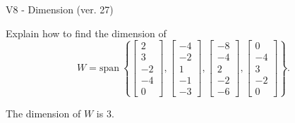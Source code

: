 \begin{exercise}
  \begin{exerciseTitle}V8 - Dimension (ver. 27)\end{exerciseTitle}
  \begin{exerciseStatement}
    Explain how to find the dimension of 
\[W=\mathrm{span}\ \left\{\left[\begin{array}{r}
2 \\
3 \\
-2 \\
-4 \\
0
\end{array}\right] , \left[\begin{array}{r}
-4 \\
-2 \\
1 \\
-1 \\
-3
\end{array}\right] , \left[\begin{array}{r}
-8 \\
-4 \\
2 \\
-2 \\
-6
\end{array}\right] , \left[\begin{array}{r}
0 \\
-4 \\
3 \\
-2 \\
0
\end{array}\right]\right\}.\]



  \end{exerciseStatement}
  \begin{exerciseAnswer}
   The dimension of \(W\) is  \(3\).
  


  \end{exerciseAnswer}
\end{exercise}